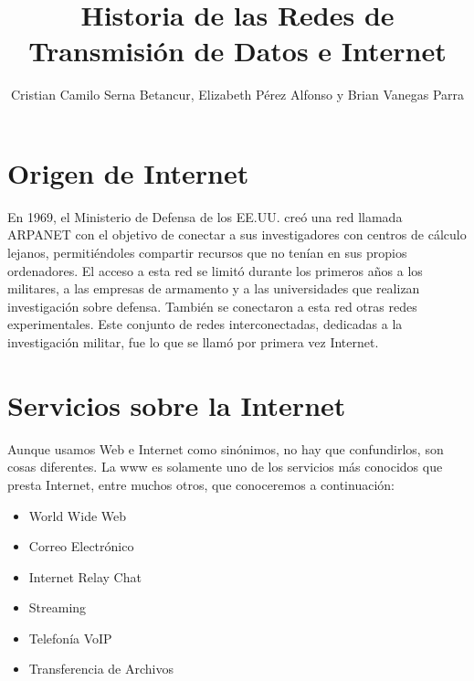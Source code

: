 \documentclass[letterpaper, 10 pt, conference]{ieeeconf}  %
\title{\LARGE \bf
    Historia de las Redes de Transmisión de Datos e Internet
}
\author{ Cristian Camilo Serna Betancur, Elizabeth Pérez Alfonso y Brian Vanegas Parra}
\begin{document}
\maketitle
\thispagestyle{empty}
\pagestyle{empty}






\section{Origen de Internet}

En 1969, el Ministerio de Defensa de los EE.UU. creó una red llamada ARPANET 
con el objetivo de conectar a sus investigadores con centros de cálculo 
lejanos, permitiéndoles compartir recursos que no tenían en sus propios
ordenadores. El acceso a esta red se limitó durante los primeros años a los 
militares, a las empresas de armamento y a las universidades que realizan 
investigación sobre defensa. También se conectaron a esta red otras redes 
experimentales. Este conjunto de redes interconectadas, dedicadas a la 
investigación militar, fue lo que se llamó por primera vez Internet.

\section{Servicios sobre la Internet}

Aunque usamos Web e Internet como sinónimos, no hay que confundirlos, son cosas 
diferentes. La www es solamente uno de los servicios más conocidos que presta 
Internet, entre muchos otros, que conoceremos a continuación: 

\begin{itemize}
    \item World Wide Web
    \item Correo Electrónico
    \item Internet Relay Chat
    \item Streaming
    \item Telefonía VoIP
    \item Transferencia de Archivos
\end{itemize}
\end{document}
